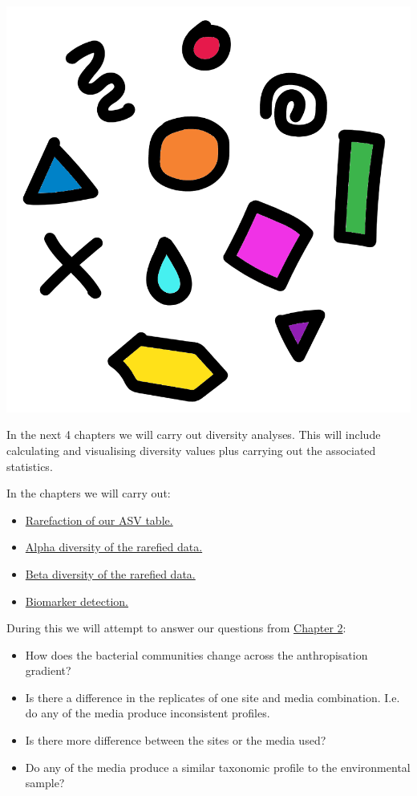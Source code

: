 \documentclass[
]{book}
\providecommand{\tightlist}{%
  \setlength{\itemsep}{0pt}\setlength{\parskip}{0pt}}
\begin{document}
\includegraphics{figures/diversity.png}

In the next 4 chapters we will carry out diversity analyses. This will include calculating and visualising diversity values plus carrying out the associated statistics.

In the chapters we will carry out:

\begin{itemize}
\tightlist
\item
  \protect\hyperlink{rarefaction_chap}{Rarefaction of our ASV table.}
\item
  \protect\hyperlink{alpha_chap}{Alpha diversity of the rarefied data.}
\item
  \protect\hyperlink{beta_chap}{Beta diversity of the rarefied data.}
\item
  \protect\hyperlink{DA_chap}{Biomarker detection.}
\end{itemize}

During this we will attempt to answer our questions from \protect\hyperlink{sum_and_qs}{Chapter 2}:

\begin{itemize}
\tightlist
\item
  How does the bacterial communities change across the anthropisation gradient?
\item
  Is there a difference in the replicates of one site and media combination. I.e. do any of the media produce inconsistent profiles.
\item
  Is there more difference between the sites or the media used?
\item
  Do any of the media produce a similar taxonomic profile to the environmental sample?
\end{itemize}
\end{document}
